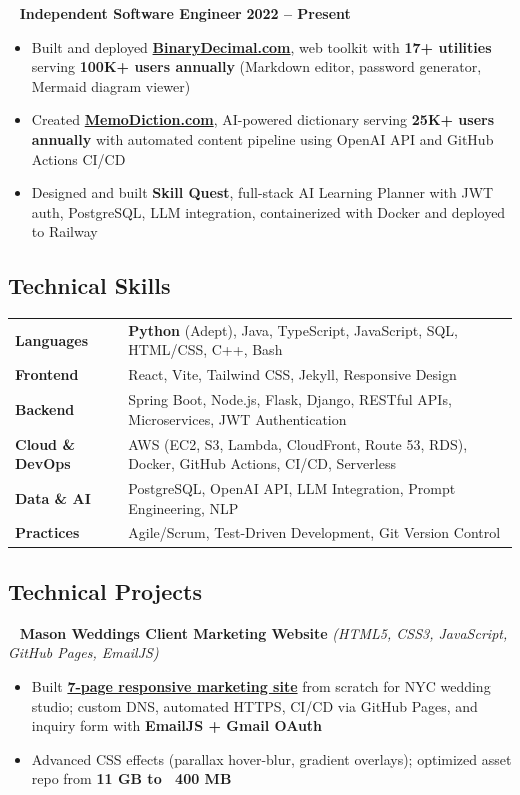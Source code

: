 \documentclass[12pt,letterpaper]{article}
\newcommand{\normalsizesection}{\normalsize}
\newcommand{\smallersection}{\small}
\newcommand{\sectionbox}[1]{%
    \vspace{0.1em}
    \begin{tcolorbox}[
        colback=sectionbg,
        colframe=sectionbg,
        width=\textwidth,
        left=5pt,
        right=5pt,
        top=2pt,
        bottom=2pt,
        boxrule=0pt,
        arc=0pt,
        boxsep=0pt,
    ]
    \section*{#1}
    \end{tcolorbox}
    \vspace{-0.4em}
}
\newcommand{\yearsright}[1]{{\footnotesize\bfseries\color{yearcolor} #1}}
\newcommand{\tech}[1]{\textit{(#1)}}
\newenvironment{projectentry}{%
    \leftskip=0cm
    \par\noindent
}{\par\leftskip=0cm\vspace{-2pt}}
\newenvironment{projectdesc}{%
    \footnotesize
    \begin{itemize}[leftmargin=*, topsep=0pt, itemsep=0pt, parsep=0pt]
}{\end{itemize}\smallersection\vspace{1pt}}
\newcommand{\projicon}[1]{%
    {\small\color{gray!70}#1}~%
}
\begin{document}
\vspace{2pt}
\begin{projectentry}
    \projicon{\faBriefcase} \textbf{Independent Software Engineer} \hfill \yearsright{2022 -- Present}
\end{projectentry}
\begin{projectdesc}
    \item Built and deployed \href{https://binarydecimal.com}{\textbf{BinaryDecimal.com}}, web toolkit with \textbf{17+ utilities} serving \textbf{100K+ users annually} (Markdown editor, password generator, Mermaid diagram viewer)
    \item Created \href{https://memodiction.com}{\textbf{MemoDiction.com}}, AI-powered dictionary serving \textbf{25K+ users annually} with automated content pipeline using OpenAI API and GitHub Actions CI/CD
    \item Designed and built \textbf{Skill Quest}, full-stack AI Learning Planner with JWT auth, PostgreSQL, LLM integration, containerized with Docker and deployed to Railway
\end{projectdesc}

\normalsizesection

\sectionbox{Technical Skills}
\smallersection

\begin{tabularx}{\textwidth}{@{} l X @{}}
\textbf{Languages} & \textbf{Python} (Adept), Java, TypeScript, JavaScript, SQL, HTML/CSS, C++, Bash \\[4pt]
\textbf{Frontend} & React, Vite, Tailwind CSS, Jekyll, Responsive Design \\[4pt]
\textbf{Backend} & Spring Boot, Node.js, Flask, Django, RESTful APIs, Microservices, JWT Authentication \\[4pt]
\textbf{Cloud \& DevOps} & AWS (EC2, S3, Lambda, CloudFront, Route 53, RDS), Docker, GitHub Actions, CI/CD, Serverless \\[4pt]
\textbf{Data \& AI} & PostgreSQL, OpenAI API, LLM Integration, Prompt Engineering, NLP \\[4pt]
\textbf{Practices} & Agile/Scrum, Test-Driven Development, Git Version Control
\end{tabularx}

\normalsizesection

\sectionbox{Technical Projects}
\smallersection


\begin{projectentry}
    \projicon{\faGlobe} \textbf{Mason Weddings \textemdash{} Client Marketing Website} \tech{HTML5, CSS3, JavaScript, GitHub Pages, EmailJS}
\end{projectentry}
\begin{projectdesc}
    \item Built \href{https://masonweddings.com}{\textbf{7-page responsive marketing site}} from scratch for NYC wedding studio; custom DNS, automated HTTPS, CI/CD via GitHub Pages, and inquiry form with \textbf{EmailJS + Gmail OAuth}
    \item Advanced CSS effects (parallax hover-blur, gradient overlays); optimized asset repo from \textbf{11 GB to ~400 MB}
\end{projectdesc}
\end{document}
